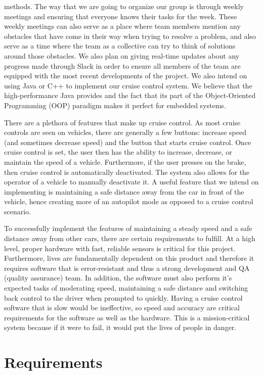 \documentclass[preprint,11pt,3p]{article}
\begin{document}
methods. The way that we are going to organize our group is through weekly
meetings and ensuring that everyone knows their tasks for the week. These
weekly meetings can also serve as a place where team members mention any
obstacles that have come in their way when trying to resolve a problem, and
also serve as a time where the team as a collective can try to think of solutions
around those obstacles. We also plan on giving real-time updates about any
progress made through Slack in order to ensure all members of the team are
equipped with the most recent developments of the project. We also intend on
using Java or C++ to implement our cruise control system. We believe that the
high-performance Java provides and the fact that its part of the Object-Oriented
Programming (OOP) paradigm makes it perfect for embedded systems. \par
There are a plethora of features that make up cruise control. As most cruise
controls are seen on vehicles, there are generally a few buttons: increase speed
(and sometimes decrease speed) and the button that starts cruise control. Once
cruise control is set, the user then has the ability to increase, decrease, or
maintain the speed of a vehicle. Furthermore, if the user presses on the brake,
then cruise control is automatically deactivated. The system also allows for the
operator of a vehicle to manually deactivate it. A useful feature that we intend
on implementing is maintaining a safe distance away from the car in front of
the vehicle, hence creating more of an autopilot mode as opposed to a cruise
control scenario. \par
To successfully implement the features of maintaining a steady speed and a
safe distance away from other cars, there are certain requirements to fulfill. At a
high level, proper hardware with fast, reliable sensors is critical for this project.
Furthermore, lives are fundamentally dependent on this product and therefore
it requires software that is error-resistant and thus a strong development and
QA (quality assurance) team. In addition, the software must also perform it’s
expected tasks of moderating speed, maintaining a safe distance and switching
back control to the driver when prompted to quickly. Having a cruise control
software that is slow would be ineffective, so speed and accuracy are critical
requirements for the software as well as the hardware. This is a mission-critical
system because if it were to fail, it would put the lives of people in danger.

\newpage
\section{Requirements}
\end{document}
